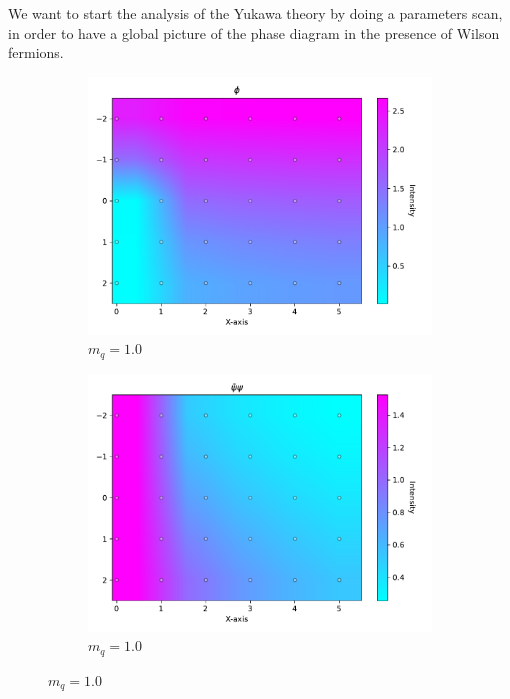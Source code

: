 We want to start the analysis of the Yukawa theory by doing a parameters scan, in order to have a global picture of the phase diagram in the presence of Wilson fermions.
\begin{figure}
    \centering
    \begin{subfigure}[b]{0.48\textwidth}
        \includegraphics[width=\textwidth]{figures/phase_diagram/m_g_phi.pdf}
        \caption{$m_q = 1.0$}
    \end{subfigure}
    \begin{subfigure}[b]{0.48\textwidth}
        \includegraphics[width=\textwidth]{figures/phase_diagram/m_g_cond.pdf}
        \caption{$m_q = 1.0$}
    \end{subfigure}

\end{figure}
